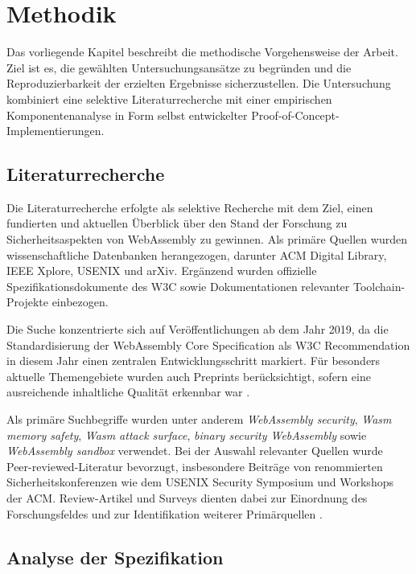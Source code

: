 \clearpage

\section{Methodik}

Das vorliegende Kapitel beschreibt die methodische Vorgehensweise der Arbeit. Ziel ist es, die gewählten Untersuchungsansätze zu begründen und die Reproduzierbarkeit der erzielten Ergebnisse sicherzustellen. Die Untersuchung kombiniert eine selektive Literaturrecherche mit einer empirischen Komponentenanalyse in Form selbst entwickelter Proof-of-Concept-Implementierungen.

\subsection{Literaturrecherche}

Die Literaturrecherche erfolgte als selektive Recherche mit dem Ziel, einen fundierten und aktuellen Überblick über den Stand der Forschung zu Sicherheitsaspekten von WebAssembly zu gewinnen. Als primäre Quellen wurden wissenschaftliche Datenbanken herangezogen, darunter ACM Digital Library, IEEE Xplore, USENIX und arXiv. Ergänzend wurden offizielle Spezifikationsdokumente des W3C sowie Dokumentationen relevanter Toolchain-Projekte einbezogen.

Die Suche konzentrierte sich auf Veröffentlichungen ab dem Jahr 2019, da die Standardisierung der WebAssembly Core Specification als W3C Recommendation in diesem Jahr einen zentralen Entwicklungsschritt markiert. Für besonders aktuelle Themengebiete wurden auch Preprints berücksichtigt, sofern eine ausreichende inhaltliche Qualität erkennbar war \cite{corrias2026analysis}.

Als primäre Suchbegriffe wurden unter anderem \textit{WebAssembly security}, \textit{Wasm memory safety}, \textit{Wasm attack surface}, \textit{binary security WebAssembly} sowie \textit{WebAssembly sandbox} verwendet. Bei der Auswahl relevanter Quellen wurde Peer-reviewed-Literatur bevorzugt, insbesondere Beiträge von renommierten Sicherheitskonferenzen wie dem USENIX Security Symposium und Workshops der ACM. Review-Artikel und Surveys dienten dabei zur Einordnung des Forschungsfeldes und zur Identifikation weiterer Primärquellen \cite{PERRONE2025100728,2023-30049}.

\subsection{Analyse der Spezifikation}


